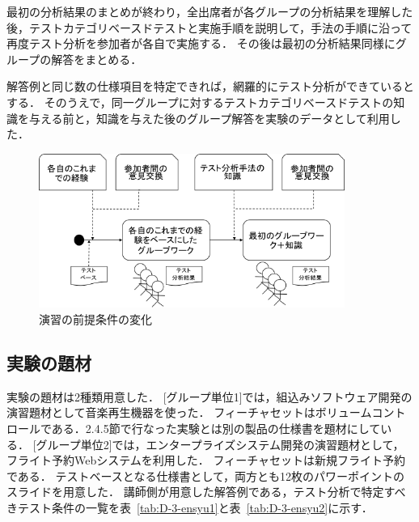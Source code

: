 最初の分析結果のまとめが終わり，全出席者が各グループの分析結果を理解した後，テストカテゴリベースドテストと実施手順を説明して，手法の手順に沿って再度テスト分析を参加者が各自で実施する．
その後は最初の分析結果同様にグループの解答をまとめる．

解答例と同じ数の仕様項目を特定できれば，網羅的にテスト分析ができているとする．
そのうえで，同一グループに対するテストカテゴリベースドテストの知識を与える前と，知識を与えた後のグループ解答を実験のデータとして利用した．
\begin{figure}[h]
\begin{center}
\includegraphics[width=10cm]{./image/D-3-ExparimentAbst1.png}
\caption{演習の前提条件の変化}
\label{fig:D-3-ExparimentAbst1}
\end{center}
\end{figure}

\subsection{実験の題材}
実験の題材は2種類用意した．
[グループ単位1]では，組込みソフトウェア開発の演習題材として音楽再生機器を使った．
フィーチャセットはボリュームコントロールである．2.4.5節で行なった実験とは別の製品の仕様書を題材にしている．
[グループ単位2]では，エンタープライズシステム開発の演習題材として，フライト予約Webシステムを利用した．
フィーチャセットは新規フライト予約である．
テストベースとなる仕様書として，両方とも12枚のパワーポイントのスライドを用意した．
講師側が用意した解答例である，テスト分析で特定すべきテスト条件の一覧を表~\ref{tab:D-3-ensyu1}と表~\ref{tab:D-3-ensyu2}に示す．

